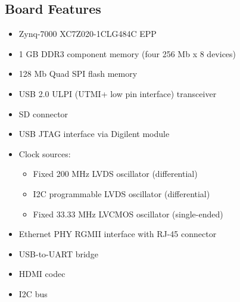 \subsection{Board Features}
\label{zynq:features}
\nocite{Zynq7000:UserGuide}
\begin{itemize}
    \item Zynq-7000 XC7Z020-1CLG484C \gls{EPP}
    \item 1 GB \gls{DDR}3 component memory (four 256 Mb x 8 devices)
    \item 128 Mb Quad \gls{SPI} flash memory
    \item \gls{USB} 2.0 ULPI (UTMI+ low pin interface) transceiver
    \item \gls{SD} connector
    \item \gls{USB} \gls{JTAG} interface via Digilent module
    \item Clock sources:
    \begin{itemize}
        \item Fixed 200 MHz \gls{LVDS} oscillator (differential)
        \item \gls{I2C} programmable \gls{LVDS} oscillator (differential)
        \item Fixed 33.33 MHz \gls{LVCMOS} oscillator (single-ended)
    \end{itemize}
    \item Ethernet \gls{PHY} \gls{RGMII} interface with RJ-45 connector
    \item \gls{USB}-to-\gls{UART} bridge
    \item \gls{HDMI} codec
    \item \gls{I2C} bus
    

\end{itemize}
